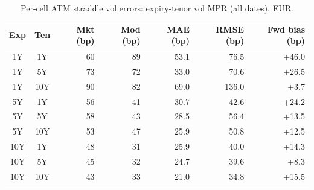 \begin{table}[H]
\centering
\caption{Per-cell ATM straddle vol errors: expiry-tenor vol MPR (all dates). EUR.}
\label{tab:expiry_tenor_vol_mpr_per_cell_all}
\small
\begin{tabular}{@{}ccrrrrr@{}}
\toprule
\textbf{Exp} & \textbf{Ten} & \textbf{Mkt (bp)} & \textbf{Mod (bp)} & \textbf{MAE (bp)} & \textbf{RMSE (bp)} & \textbf{Fwd bias (bp)} \\
\midrule
  1Y & 1Y & 60 & 89 & 53.1 & 76.5 & +46.0 \\
  1Y & 5Y & 73 & 72 & 33.0 & 70.6 & +26.5 \\
  1Y & 10Y & 90 & 82 & 69.0 & 136.0 & +3.7 \\
  \midrule
  5Y & 1Y & 56 & 41 & 30.7 & 42.6 & +24.2 \\
  5Y & 5Y & 58 & 43 & 28.5 & 56.4 & +13.5 \\
  5Y & 10Y & 53 & 47 & 25.9 & 50.8 & +12.5 \\
  \midrule
  10Y & 1Y & 48 & 31 & 25.9 & 40.0 & +14.3 \\
  10Y & 5Y & 45 & 32 & 24.7 & 39.6 & +8.3 \\
  10Y & 10Y & 43 & 33 & 21.0 & 34.8 & +15.5 \\
\bottomrule
\end{tabular}
\end{table}